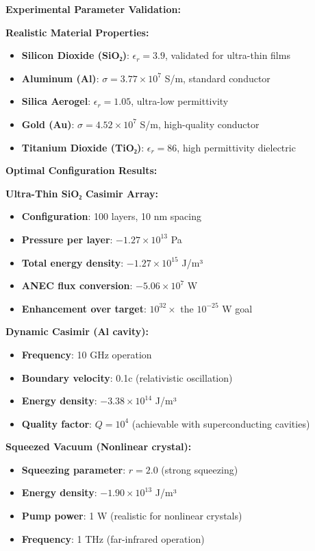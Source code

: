 \documentclass[11pt]{article}
\begin{document}
\textbf{Experimental Parameter Validation:}

\textbf{Realistic Material Properties:}
\begin{itemize}
    \item \textbf{Silicon Dioxide (SiO₂)}: $\epsilon_r = 3.9$, validated for ultra-thin films
    \item \textbf{Aluminum (Al)}: $\sigma = 3.77 \times 10^7$ S/m, standard conductor
    \item \textbf{Silica Aerogel}: $\epsilon_r = 1.05$, ultra-low permittivity
    \item \textbf{Gold (Au)}: $\sigma = 4.52 \times 10^7$ S/m, high-quality conductor
    \item \textbf{Titanium Dioxide (TiO₂)}: $\epsilon_r = 86$, high permittivity dielectric
\end{itemize}

\textbf{Optimal Configuration Results:}

\textbf{Ultra-Thin SiO₂ Casimir Array:}
\begin{itemize}
    \item \textbf{Configuration}: 100 layers, 10 nm spacing
    \item \textbf{Pressure per layer}: $-1.27 \times 10^{13}$ Pa
    \item \textbf{Total energy density}: $-1.27 \times 10^{15}$ J/m³
    \item \textbf{ANEC flux conversion}: $-5.06 \times 10^7$ W
    \item \textbf{Enhancement over target}: $10^{32} \times$ the $10^{-25}$ W goal
\end{itemize}

\textbf{Dynamic Casimir (Al cavity):}
\begin{itemize}
    \item \textbf{Frequency}: 10 GHz operation
    \item \textbf{Boundary velocity}: 0.1c (relativistic oscillation)
    \item \textbf{Energy density}: $-3.38 \times 10^{14}$ J/m³
    \item \textbf{Quality factor}: $Q = 10^4$ (achievable with superconducting cavities)
\end{itemize}

\textbf{Squeezed Vacuum (Nonlinear crystal):}
\begin{itemize}
    \item \textbf{Squeezing parameter}: $r = 2.0$ (strong squeezing)
    \item \textbf{Energy density}: $-1.90 \times 10^{13}$ J/m³
    \item \textbf{Pump power}: 1 W (realistic for nonlinear crystals)
    \item \textbf{Frequency}: 1 THz (far-infrared operation)
\end{itemize}
\end{document}
